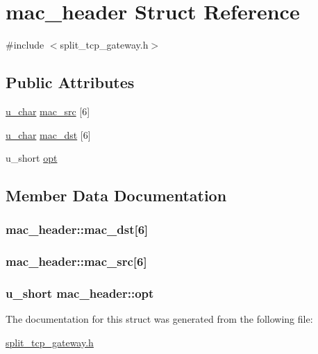 \hypertarget{structmac__header}{\section{mac\-\_\-header \-Struct \-Reference}
\label{structmac__header}
}


{\ttfamily \#include $<$split\-\_\-tcp\-\_\-gateway.\-h$>$}

\subsection*{\-Public \-Attributes}
\begin{DoxyCompactItemize}
\item 
\hyperlink{split__tcp__gateway_8h_ae2b02ed168fc99cff3851603910b1fb6}{u\-\_\-char} \hyperlink{structmac__header_afcbcd464f2a133de30bd33edae22f296}{mac\-\_\-src} \mbox{[}6\mbox{]}
\item 
\hyperlink{split__tcp__gateway_8h_ae2b02ed168fc99cff3851603910b1fb6}{u\-\_\-char} \hyperlink{structmac__header_a1ccca7803ed3bdc007e0d0091061eeed}{mac\-\_\-dst} \mbox{[}6\mbox{]}
\item 
u\-\_\-short \hyperlink{structmac__header_a0c81aee566e934480ffc598deaf9787b}{opt}
\end{DoxyCompactItemize}


\subsection{\-Member \-Data \-Documentation}
\hypertarget{structmac__header_a1ccca7803ed3bdc007e0d0091061eeed}{
\subsubsection[{mac\-\_\-dst}]{ {\bf mac\-\_\-header\-::mac\-\_\-dst}\mbox{[}6\mbox{]}}}\label{structmac__header_a1ccca7803ed3bdc007e0d0091061eeed}
\hypertarget{structmac__header_afcbcd464f2a133de30bd33edae22f296}{
\subsubsection[{mac\-\_\-src}]{ {\bf mac\-\_\-header\-::mac\-\_\-src}\mbox{[}6\mbox{]}}}\label{structmac__header_afcbcd464f2a133de30bd33edae22f296}
\hypertarget{structmac__header_a0c81aee566e934480ffc598deaf9787b}{
\subsubsection[{opt}]{\setlength{\rightskip}{0pt plus 5cm}u\-\_\-short {\bf mac\-\_\-header\-::opt}}}\label{structmac__header_a0c81aee566e934480ffc598deaf9787b}


\-The documentation for this struct was generated from the following file\-:\begin{DoxyCompactItemize}
\item 
\hyperlink{split__tcp__gateway_8h}{split\-\_\-tcp\-\_\-gateway.\-h}\end{DoxyCompactItemize}

